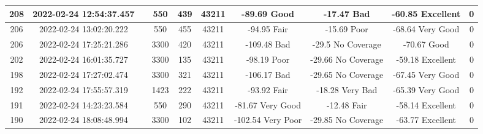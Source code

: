 \begin{longtable*}{|c|c|c|c|c|c|c|c|c|c|}
208&2022-02-24 12:54:37.457&&550&439&43211& -89.69    Good        & -17.47    Bad         & -60.85    Excellent   & 0\\\hline
{}206&2022-02-24 13:02:20.222&&550&455&43211& -94.95    Fair        & -15.69    Poor        & -68.64    Very Good   & 0\\\hline
{}206&2022-02-24 17:25:21.286&&3300&420&43211& -109.48   Bad         & -29.5     No Coverage & -70.67    Good        & 0\\\hline
{}202&2022-02-24 16:01:35.727&&3300&135&43211& -98.19    Poor        & -29.66    No Coverage & -59.18    Excellent   & 0\\\hline
{}198&2022-02-24 17:27:02.474&&3300&321&43211& -106.17   Bad         & -29.65    No Coverage & -67.45    Very Good   & 0\\\hline
{}192&2022-02-24 17:55:57.319&&1423&222&43211& -93.92    Fair        & -18.28    Very Bad    & -65.39    Very Good   & 0\\\hline
{}191&2022-02-24 14:23:23.584&&550&290&43211& -81.67    Very Good   & -12.48    Fair        & -58.14    Excellent   & 0\\\hline
{}190&2022-02-24 18:08:48.994&&3300&102&43211& -102.54   Very Poor   & -29.85    No Coverage & -63.77    Excellent   & 0\\\hline

\end{longtable*}
